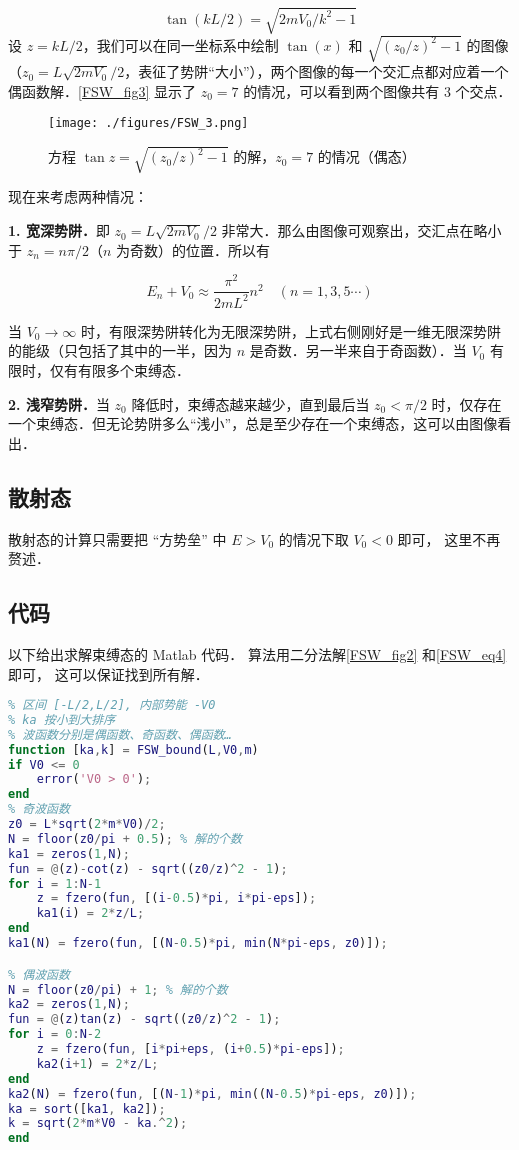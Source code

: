 \begin{equation}
\tan(k L/2)=\sqrt{2mV_0/k^2-1}
\end{equation}
设 $z=k L/2$，我们可以在同一坐标系中绘制 $\tan(x)$ 和 $\sqrt{(z_0/z)^2-1}$ 的图像（$z_0=L\sqrt{2mV_0}/2$，表征了势阱“大小”），两个图像的每一个交汇点都对应着一个偶函数解．\autoref{FSW_fig3} 显示了 $z_0=7$ 的情况，可以看到两个图像共有 $3$ 个交点．

\begin{figure}[ht]
\centering
\texttt{[image: ./figures/FSW\_3.png]}
\caption{方程 $\tan z=\sqrt{(z_0/z)^2-1}$ 的解，$z_0=7$ 的情况（偶态）} \label{FSW_fig3}
\end{figure}

现在来考虑两种情况：

\textbf{1. 宽深势阱．}即 $z_0=L\sqrt{2mV_0}/2$ 非常大．那么由图像可观察出，交汇点在略小于 $z_n=n\pi/2$（$n$ 为奇数）的位置．所以有

\begin{equation}
E_n+V_0\approx \frac{\pi^2}{2mL^2}n^2\quad (n=1,3,5\cdots)
\end{equation}

当 $V_0\rightarrow \infty$ 时，有限深势阱转化为无限深势阱，上式右侧刚好是一维无限深势阱的能级（只包括了其中的一半，因为 $n$ 是奇数．另一半来自于奇函数）．当 $V_0$ 有限时，仅有有限多个束缚态．

\textbf{2. 浅窄势阱．}当 $z_0$ 降低时，束缚态越来越少，直到最后当 $z_0<\pi/2$ 时，仅存在一个束缚态．但无论势阱多么“浅小”，总是至少存在一个束缚态，这可以由图像看出．

\subsection{散射态}

散射态的计算只需要把 “方势垒” 中 $E > V_0$ 的情况下取 $V_0 < 0$ 即可， 这里不再赘述．

\subsection{代码}
以下给出求解束缚态的 Matlab 代码． 算法用二分法解\autoref{FSW_fig2} 和\autoref{FSW_eq4} 即可， 这可以保证找到所有解．

\begin{lstlisting}[language=matlab, caption=FSW\_bound.m]
% 有限深势阱的束缚态
% 区间 [-L/2,L/2], 内部势能 -V0
% ka 按小到大排序
% 波函数分别是偶函数、奇函数、偶函数…
function [ka,k] = FSW_bound(L,V0,m)
if V0 <= 0
    error('V0 > 0');
end
% 奇波函数
z0 = L*sqrt(2*m*V0)/2;
N = floor(z0/pi + 0.5); % 解的个数
ka1 = zeros(1,N);
fun = @(z)-cot(z) - sqrt((z0/z)^2 - 1);
for i = 1:N-1
    z = fzero(fun, [(i-0.5)*pi, i*pi-eps]);
    ka1(i) = 2*z/L;
end
ka1(N) = fzero(fun, [(N-0.5)*pi, min(N*pi-eps, z0)]);

% 偶波函数
N = floor(z0/pi) + 1; % 解的个数
ka2 = zeros(1,N);
fun = @(z)tan(z) - sqrt((z0/z)^2 - 1);
for i = 0:N-2
    z = fzero(fun, [i*pi+eps, (i+0.5)*pi-eps]);
    ka2(i+1) = 2*z/L;
end
ka2(N) = fzero(fun, [(N-1)*pi, min((N-0.5)*pi-eps, z0)]);
ka = sort([ka1, ka2]);
k = sqrt(2*m*V0 - ka.^2);
end
\end{lstlisting}
